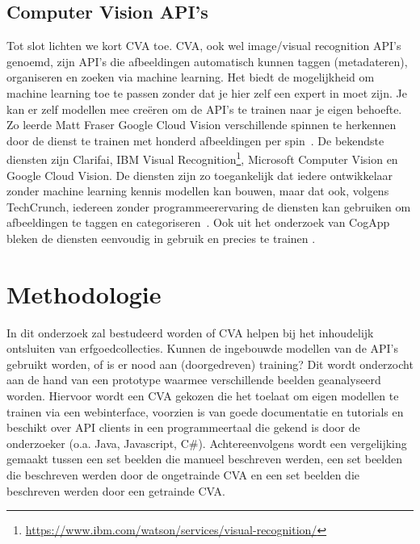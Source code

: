 \subsection{Computer Vision API's}
Tot slot lichten we kort CVA toe. CVA, ook wel image/visual recognition API's genoemd, zijn API's die afbeeldingen automatisch kunnen taggen (metadateren), organiseren en zoeken via machine learning. Het biedt de mogelijkheid om machine learning toe te passen zonder dat je hier zelf een expert in moet zijn. Je kan er zelf modellen mee cre\"{e}ren om de API's te trainen naar je eigen behoefte. Zo leerde Matt Fraser Google Cloud Vision verschillende spinnen te herkennen door de dienst te trainen met honderd afbeeldingen per spin~\autocite{Fraser2018}.  De bekendste diensten zijn Clarifai, IBM Visual Recognition\footnote{\url{https://www.ibm.com/watson/services/visual-recognition/}}, Microsoft Computer Vision en Google Cloud Vision.  De diensten zijn zo toegankelijk dat iedere ontwikkelaar zonder machine learning kennis modellen kan bouwen, maar dat ook, volgens TechCrunch, iedereen zonder programmeerervaring de diensten kan gebruiken om afbeeldingen te taggen en categoriseren~\autocite{Lardinois2018}. Ook uit het onderzoek van CogApp bleken de diensten eenvoudig in gebruik en precies te trainen \autocite{Hindle2017}.

\section{Methodologie}

In dit onderzoek zal bestudeerd worden of CVA helpen bij het inhoudelijk ontsluiten van erfgoedcollecties. Kunnen de ingebouwde modellen van de API's gebruikt worden, of is er nood aan (doorgedreven) training? Dit wordt onderzocht aan de hand van een prototype waarmee verschillende beelden geanalyseerd worden. Hiervoor wordt een CVA gekozen die het toelaat om eigen modellen te trainen via een webinterface, voorzien is van goede documentatie en tutorials en beschikt over API clients in een programmeertaal die gekend is door de onderzoeker (o.a. Java, Javascript, C\#). Achtereenvolgens wordt een vergelijking gemaakt tussen een set beelden die manueel beschreven werden, een set beelden die beschreven werden door de ongetrainde CVA en een set beelden die beschreven werden door een getrainde CVA.

